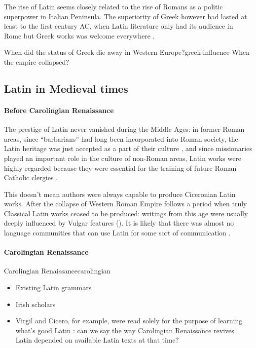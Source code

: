 \documentclass[a4paper, oneside, 12pt]{report}
\newcommand*{\citepage}[1]{p.~{#1}}
\begin{document}
The rise of Latin seems closely related to the rise of Romans as a politic superpower
in Italian Peninsula.
The superiority of Greek however had lasted at least to the first century AC,
when Latin literature only had its audience in Rome
but Greek works was welcome everywhere
\citep[\citepage{52}]{leonhardt2013latin}. 

\begin{todobox}{When did the status of Greek die away in Western Europe?}{greek-influence}
    When the empire collapsed?
\end{todobox}

\subsection{Latin in Medieval times}

\paragraph*{Before Carolingian Renaissance}
The prestige of Latin never vanished during the Middle Ages:
in former Roman areas, since ``barbarians'' had long been incorporated into Roman society, 
the Latin heritage was just accepted as a part of their culture 
\citep[\citepage{137}]{leonhardt2013latin},
and since missionaries played an important role in the culture of non-Roman areas, 
Latin works were highly regarded because they were essential 
for the training of future Roman Catholic clergies
\citep[\citepage{138}]{leonhardt2013latin}.

This doesn't mean authors were always capable to produce Ciceronian Latin works.
After the collapse of Western Roman Empire follows
a period when truly Classical Latin works ceased to be produced:
writings from this age were usually deeply influenced by Vulgar features 
().
It is likely that there was almost no language communities
that can use Latin for some sort of communication 
\citep[\citepage{160}]{leonhardt2013latin}.

\paragraph*{Carolingian Renaissance}

\begin{todobox}{Carolingian Renaissance}{carolingian}
    \begin{itemize}
        \item Existing Latin grammars 
        \item Irish scholars
        \item Virgil and Cicero, for example, were read solely for the purpose of learning what's good Latin
        \citep[\citepage{170}]{leonhardt2013latin}:
        can we say the way Carolingian Renaissance revives Latin
        depended on available Latin texts at that time?
    \end{itemize}
\end{todobox}
\end{document}
